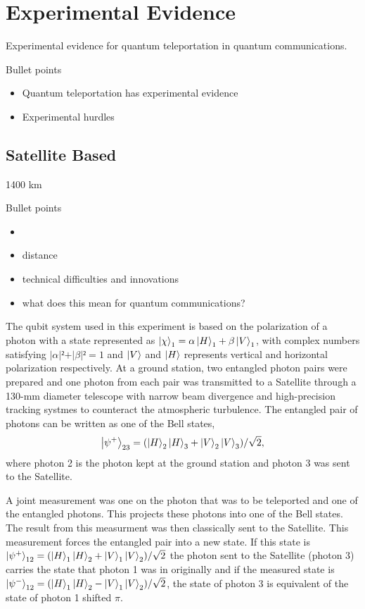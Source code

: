 \section{Experimental Evidence}
Experimental evidence for quantum teleportation in quantum communications.
\begin{mybox}{Bullet points}
    \begin{itemize}
        \item Quantum teleportation has experimental evidence
        \item Experimental hurdles
    \end{itemize}
\end{mybox}
\subsection{Satellite Based}

1400 km \cite{Ren:2017}
\begin{mybox}{Bullet points}
    \begin{itemize}
        \item {}
        \item distance
        \item technical difficulties and innovations
        \item what does this mean for quantum communications?
    \end{itemize}
\end{mybox}

The qubit system used in this experiment is based on the polarization of a photon with a state represented as $\ket{\chi}_1 = \alpha\ket{H}_1 + \beta\ket{V}_1$, with complex numbers
satisfying $\vert\alpha\vert² + \vert\beta\vert² = 1$ and $\ket{V}$ and $\ket{H}$ represents vertical and horizontal polarization respectively.
 At a ground station, two entangled photon pairs were prepared and one photon from each pair was
transmitted to a Satellite through a 130-mm diameter telescope with narrow beam divergence and high-precision tracking systmes to counteract the atmospheric turbulence.
The entangled pair of photons can be written as one of the Bell states,
\begin{equation}
    \ket{\psi^{+}}_{23} = (\ket{H}_2\ket{H}_3 + \ket{V}_2\ket{V}_3)/\sqrt{2},
\end{equation}
where photon 2 is the photon kept at the ground station and photon 3 was sent to the Satellite.

A joint measurement was one on the photon that was to be teleported and one of the entangled photons. This projects these photons into one of the Bell states.
The result from this measurment was then classically sent to the Satellite. This measurement forces the entangled pair into a new state. If this state is 
$\ket{\psi^{+}}_{12} = (\ket{H}_1\ket{H}_2 + \ket{V}_1\ket{V}_2)/\sqrt{2}$ the photon sent to the Satellite (photon 3) carries the state that photon 1 was in originally
and if the measured state is $\ket{\psi^{-}}_{12} = (\ket{H}_1\ket{H}_2 - \ket{V}_1\ket{V}_2)/\sqrt{2}$, the state of photon 3 is equivalent of the state of photon 1 shifted $\pi$.



